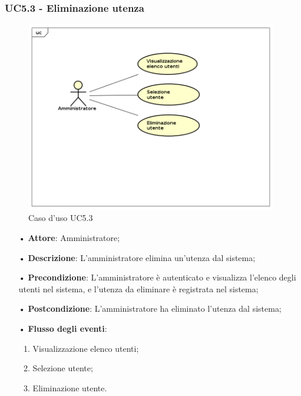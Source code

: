 \subsubsection{UC5.3 - Eliminazione utenza}


\begin{figure}[H]
\centering
\includegraphics[width=11cm]{img/UC53.png} 
\caption{Caso d'uso UC5.3}
\end{figure}


\begin{itemize}
\item[•] \textbf{Attore}: Amministratore;

\item[•] \textbf{Descrizione}: L’amministratore elimina un’utenza dal sistema;

\item[•] \textbf{Precondizione}: L’amministratore \`{e} autenticato e visualizza l’elenco degli utenti nel sistema, e l’utenza da eliminare \`{e} registrata nel sistema;

\item[•] \textbf{Postcondizione}: L’amministratore ha eliminato l’utenza dal sistema; 

\item[•] \textbf{Flusso degli eventi}:

\begin{enumerate}

\item Visualizzazione elenco utenti;

\item Selezione utente;

\item Eliminazione utente.

\end{enumerate}

\end{itemize}
